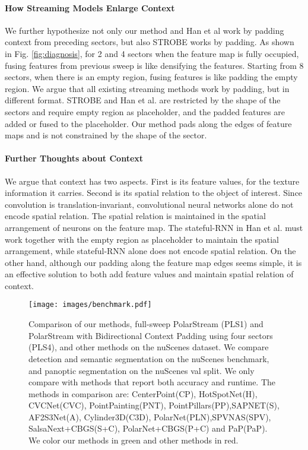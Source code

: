 \documentclass{article}
\begin{document}
\paragraph{How Streaming Models Enlarge Context}
 We further hypothesize not only our method and Han et al work by padding context from preceding sectors, but also STROBE works by padding. As shown in Fig. \ref{fig:diagnosis}, for 2 and 4 sectors when the feature map is fully occupied, fusing features from previous sweep is like densifying the features. Starting from 8 sectors, when there is an empty region, fusing features is like padding the empty region. We argue that all existing streaming methods work by padding, but in different format. STROBE and Han et al. are restricted by the shape of the sectors and require empty region as placeholder, and the padded features are added or fused to the placeholder. Our method pads along the edges of feature maps and is not constrained by the shape of the sector.

\paragraph{Further Thoughts about Context}We argue that context has two aspects. First is its feature values, for the texture information it carries. Second is its spatial relation to the object of interest. Since convolution is translation-invariant, convolutional neural networks alone do not encode spatial relation. The spatial relation is maintained in the spatial arrangement of neurons on the feature map. The stateful-RNN in Han et al. must work together with the empty region as placeholder to maintain the spatial arrangement, while stateful-RNN alone does not encode spatial relation. On the other hand, although our padding along the feature map edges seems simple, it is an effective solution to both add feature values and maintain spatial relation of context.


 \begin{figure}
  \centering 
\texttt{[image: images/benchmark.pdf]}
  \caption{Comparison of our methods, full-sweep PolarStream (PLS1) and PolarStream with Bidirectional Context Padding using four sectors (PLS4), and other methods on the nuScenes dataset. We compare detection and semantic segmentation on the nuScenes benchmark, and panoptic segmentation on the nuScenes val split. We only compare with methods that report both accuracy and runtime. The methods in comparison are: CenterPoint\cite{yin2020center}(CP), HotSpotNet\cite{chen2020object}(H), CVCNet\cite{chen2020every}(CVC), PointPainting\cite{vora2020pointpainting}(PNT), PointPillars\cite{lang2019pointpillars}(PP),SAPNET\cite{ye2020sarpnet}(S), AF2S3Net\cite{cheng20212}(A), Cylinder3D\cite{zhou2020cylinder3d}(C3D), PolarNet\cite{zhang2020polarnet}(PLN),SPVNAS\cite{tang2020searching}(SPV), SalsaNext\cite{cortinhal2020salsanext}+CBGS\cite{zhu2019class}(S+C), PolarNet+CBGS(P+C) and PaP\cite{zhou2021panoptic}(PaP). We color our methods in green and other methods in red.}\label{fig:benchmark}

\end{figure}
\end{document}
